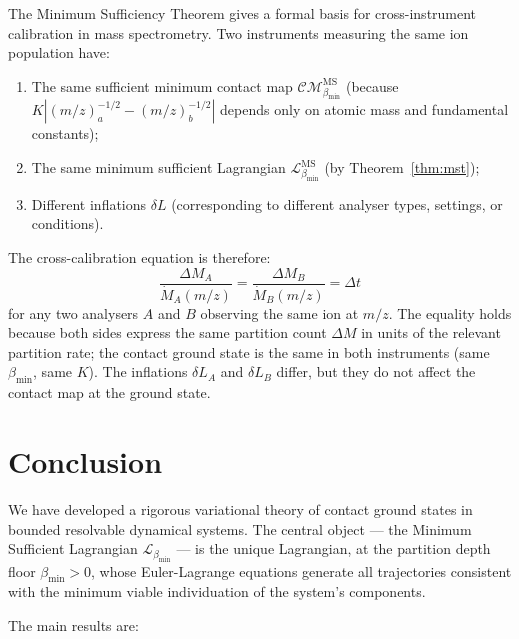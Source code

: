\documentclass[12pt, a4paper]{article}
\theoremstyle{plain}
\theoremstyle{definition}
\theoremstyle{remark}
\newcommand{\bmin}{\beta_{\min}}
\newcommand{\Lmin}{\mathcal{L}_{\bmin}}
\newcommand{\CM}{\mathcal{CM}}
\begin{document}
The Minimum Sufficiency Theorem gives a formal basis for cross-instrument
calibration in mass spectrometry. Two instruments measuring the same ion
population have:
\begin{enumerate}[label=(\roman*)]
  \item The same sufficient minimum contact map $\CM_{\bmin}^{\mathrm{MS}}$
  (because $K|(m/z)_a^{-1/2} - (m/z)_b^{-1/2}|$ depends only on atomic
  mass and fundamental constants);
  \item The same minimum sufficient Lagrangian $\Lmin^{\mathrm{MS}}$ (by
  Theorem~\ref{thm:mst});
  \item Different inflations $\delta L$ (corresponding to different analyser
  types, settings, or conditions).
\end{enumerate}
The cross-calibration equation is therefore:
\[
  \frac{\Delta M_A}{\dot{M}_A(m/z)} = \frac{\Delta M_B}{\dot{M}_B(m/z)} = \Delta t
\]
for any two analysers $A$ and $B$ observing the same ion at $m/z$. The equality
holds because both sides express the same partition count $\Delta M$ in units
of the relevant partition rate; the contact ground state is the same in both
instruments (same $\bmin$, same $K$). The inflations $\delta L_A$ and $\delta
L_B$ differ, but they do not affect the contact map at the ground state.

\section{Conclusion}
\label{sec:conclusion}

We have developed a rigorous variational theory of contact ground states in
bounded resolvable dynamical systems. The central object --- the Minimum
Sufficient Lagrangian $\Lmin$ --- is the unique Lagrangian, at the partition
depth floor $\bmin > 0$, whose Euler-Lagrange equations generate all trajectories
consistent with the minimum viable individuation of the system's components.

The main results are:
\end{document}

